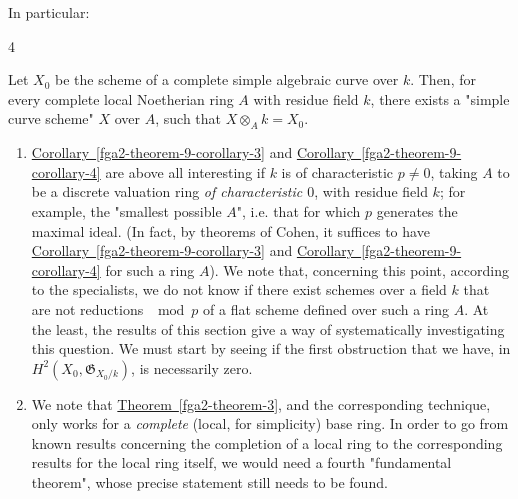   In particular:\begin{corollary}{4}\label{fga2-theorem-9-corollary-4}\skipsinglepar\par{}Let \(X_0\) be the scheme of a complete simple algebraic curve over \(k\).
    Then, for every complete local Noetherian ring \(A\) with residue field \(k\), there exists a "simple curve scheme" \(X\) over \(A\), such that \(X\otimes _Ak=X_0\).\end{corollary}\begin{remarks}{}\label{fga2-6-remarks}\skipsinglepar\begin{enumerate}\item{}\hyperref[fga2-theorem-9-corollary-3]{Corollary~\ref*{fga2-theorem-9-corollary-3}} and \hyperref[fga2-theorem-9-corollary-4]{Corollary~\ref*{fga2-theorem-9-corollary-4}} are above all interesting if \(k\) is of characteristic \(p\neq 0\), taking \(A\) to be a discrete valuation ring \emph{of characteristic \(0\)}, with residue field \(k\);
      for example, the "smallest possible \(A\)", i.e. that for which \(p\) generates the maximal ideal.
      (In fact, by theorems of Cohen, it suffices to have \hyperref[fga2-theorem-9-corollary-3]{Corollary~\ref*{fga2-theorem-9-corollary-3}} and \hyperref[fga2-theorem-9-corollary-4]{Corollary~\ref*{fga2-theorem-9-corollary-4}} for such a ring \(A\)).
      We note that, concerning this point, according to the specialists, we do not know if there exist schemes over a field \(k\) that are not reductions \(\mod  p\) of a flat scheme defined over such a ring \(A\).
      At the least, the results of this section give a way of systematically investigating this question.
      We must start by seeing if the first obstruction that we have, in \(H^2(X_0,\mathfrak {G}_{X_0/k})\), is necessarily zero.

    \item{}We note that \hyperref[fga2-theorem-3]{Theorem~\ref*{fga2-theorem-3}}, and the corresponding technique, only works for a \emph{complete} (local, for simplicity) base ring.
      In order to go from known results concerning the completion of a local ring to the corresponding results for the local ring itself, we would need a fourth "fundamental theorem", whose precise statement still needs to be found.


\end{enumerate}
\end{remarks}
